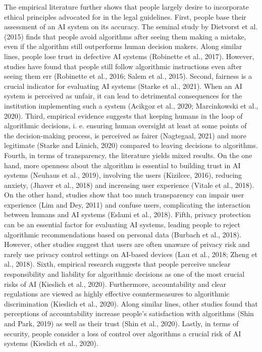 \documentclass{article}
\begin{document}
The empirical literature further shows that people largely desire to
incorporate ethical principles advocated for in the legal guidelines.
First, people base their assessment of an AI system on its accuracy. The
seminal study by Dietvorst et al. (2015) finds that people avoid
algorithms after seeing them making a mistake, even if the algorithm
still outperforms human decision makers. Along similar lines, people
lose trust in defective AI systems (Robinette et al., 2017). However,
studies have found that people still follow algorithmic instructions
even after seeing them err (Robinette et al., 2016; Salem et al., 2015).
Second, fairness is a crucial indicator for evaluating AI systems
(Starke et al., 2021). When an AI system is perceived as unfair, it can
lead to detrimental consequences for the institution implementing such a
system (Acikgoz et al., 2020; Marcinkowski et al., 2020). Third,
empirical evidence suggests that keeping humans in the loop of
algorithmic decisions, i. e. ensuring human oversight at least at some
points of the decision-making process, is perceived as fairer
(Nagtegaal, 2021) and more legitimate (Starke and Lünich, 2020) compared
to leaving decisions to algorithms. Fourth, in terms of transparency,
the literature yields mixed results. On the one hand, more openness
about the algorithm is essential to building trust in AI systems
(Neuhaus et al., 2019), involving the users (Kizilcec, 2016), reducing
anxiety, (Jhaver et al., 2018) and increasing user experience (Vitale et
al., 2018). On the other hand, studies show that too much transparency
can impair user experience (Lim and Dey, 2011) and confuse users,
complicating the interaction between humans and AI systems (Eslami et
al., 2018). Fifth, privacy protection can be an essential factor for
evaluating AI systems, leading people to reject algorithmic
recommendations based on personal data (Burbach et al., 2018). However,
other studies suggest that users are often unaware of privacy risk and
rarely use privacy control settings on AI-based devices (Lau et al.,
2018; Zheng et al., 2018). Sixth, empirical research suggests that
people perceive unclear responsibility and liability for algorithmic
decisions as one of the most crucial risks of AI (Kieslich et al.,
2020). Furthermore, accountability and clear regulations are viewed as
highly effective countermeasures to algorithmic discrimination (Kieslich
et al., 2020). Along similar lines, other studies found that perceptions
of accountability increase people's satisfaction with algorithms (Shin
and Park, 2019) as well as their trust (Shin et al., 2020). Lastly, in
terms of security, people consider a loss of control over algorithms a
crucial risk of AI systems (Kieslich et al., 2020).
\end{document}
